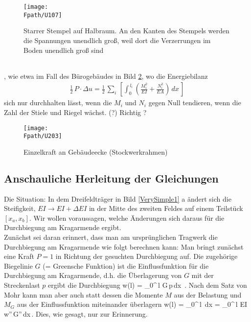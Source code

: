 {{{{%
\begin{figure}[tbp]
\centering
\if {} \sidecaption \fi
\texttt{[image: \\Fpath/U107]}
\caption{Starrer Stempel auf Halbraum. An den Kanten des Stempels werden die Spannungen
unendlich gro{\ss}, weil dort die Verzerrungen im Boden unendlich gro{\ss} sind} \label{U107}
\end{figure}%
\\

, wie etwa im Fall des B\"{u}rogeb\"{a}udes in Bild \ref{U203}, wo die Energiebilanz
\begin{align}
\frac{1}{2}\,P \cdot \Delta u = \frac{1}{2}\,\sum_i\, [ \int_0^{\,l_i} (\frac{M_i^2}{EI}+ \frac{N_i^2}{EA})\,dx \,]
\end{align}
sich nur durchhalten l\"{a}sst, wenn die $M_i$ und $N_i$ gegen Null tendieren, wenn die Zahl der Stiele und Riegel w\"{a}chst. (?) Richtig ?

\begin{figure}
\centering
{\texttt{[image: \\Fpath/U203]}}
\caption{Einzelkraft an Geb\"{a}udeecke (Stockwerkrahmen) }
\label{U203}%
%
\end{figure}%

\subsection{Anschauliche  Herleitung der Gleichungen}

Die Situation: In dem Dreifeldtr\"{a}ger in Bild \eqref{VerySimple1} a \"{a}ndert sich die Steifigkeit, $EI \to EI + \Delta EI$ in der Mitte des zweiten Feldes auf einem Teilst\"{u}ck $[x_a, x_b]$. Wir wollen voraussagen, welche \"{A}nderungen sich daraus f\"{u}r die Durchbiegung am Kragarmende ergibt.\\

Zun\"{a}chst sei daran erinnert, dass man am urspr\"{u}nglichen Tragwerk die Durchbiegung am Kragarmende wie folgt berechnen kann: Man bringt zun\"{a}chst eine Kraft $P = 1$ in Richtung der gesuchten Durchbiegung auf. Die zugeh\"{o}rige Biegelinie $G$ (= Greensche Funktion) ist die Einflussfunktion f\"{u}r die Durchbiegung am Kragarmende, d.h. die \"{U}berlagerung von $G$ mit der Streckenlast $p$ ergibt die Durchbiegung
\bfo
w(l) = \int_0^{\,l} G\,p\,dx \,.
\efo
Nach dem Satz von Mohr kann man aber auch statt dessen die Momente $M$ aus der Belastung und $M_G$ aus der Einflussfunktion miteinander \"{u}berlagern
\bfo
w(l) = \int_0^{\,l} \,dx = \int_0^{\,l} EI\,w''\,G''\,dx\,.
\efo
Dies, wie gesagt, nur zur Erinnerung. \\

}}}}
